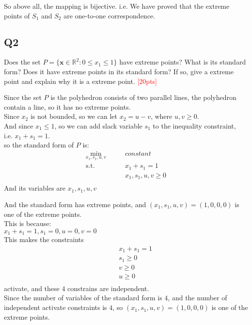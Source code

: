 \documentclass[10pt]{article}
\begin{document}
So above all, the mapping is bijective. i.e. We have proved that the extreme points of $S_1$ and $S_2$ are one-to-one correspondence.\\

\newpage
\subsection{Q2}
Does the set $P = \{ \bm{x} \in \mathbb{R}^{2} : 0 \leq x_{1} \leq 1 \}$ have extreme points? What is its standard form? Does it have extreme points in its standard form? If so, give a extreme point and explain why it is a extreme point.
\textcolor{red}{[20pts]}

Since the set $P$ is the polyhedron consists of two parallel lines, the polyhedron contain a line, so it has no extreme points.\\

Since $x_2$ is not bounded, so we can let $x_2=u-v$, where $u,v\geq 0$.\\
And since $x_1\leq 1$, so we can add slack variable $s_1$ to the inequality constraint,\\
i.e. $x_1+s_1=1$.\\

so the standard form of $P$ is:\\
\begin{equation}
	\begin{aligned}
		\min_{x_1,s_1,u,v}\qquad & constant \\ 
		\mathrm{s.t.}\qquad & x_1+s_1=1 \\
							& x_1,s_1,u,v\geq 0 \\
	\end{aligned}
\end{equation}
And its variables are $x_1,s_1,u,v$

And the standard form has extreme points, and $(x_1,s_1,u,v)=(1,0,0,0)$ is one of the extreme points.\\
This is because:\\
$x_1+s_1=1, s_1=0, u=0, v=0$\\
This makes the constraints 
\begin{equation}
	\begin{aligned}
		\qquad & x_1+s_1=1 \\
			   & s_1\geq 0 \\
			   & v\geq 0 \\
			   & u\geq 0 \\
	\end{aligned}
\end{equation}
activate, and these $4$ constrains are independent.\\
Since the number of variables of the standard form is $4$, and the number of independent activate constraints is $4$, so $(x_1,s_1,u,v)=(1,0,0,0)$ is one of the extreme points.\\ 
\end{document}
